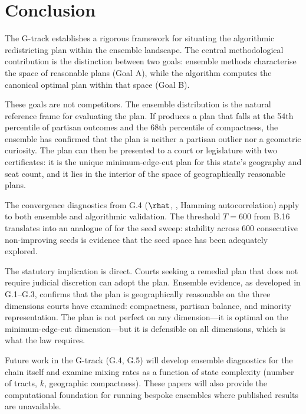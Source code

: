 \section{Conclusion}
\label{sec:conclusion}

The G-track establishes a rigorous framework for situating the \ar{}
algorithmic redistricting plan within the ensemble landscape.  The central
methodological contribution is the distinction between two goals: ensemble
methods characterise the space of reasonable plans (Goal A), while the
\ar{} algorithm computes the canonical optimal plan within that space (Goal B).

These goals are not competitors.  The ensemble distribution is the natural
reference frame for evaluating the \ar{} plan.  If \ar{} produces a plan that
falls at the 54th percentile of partisan outcomes and the 68th percentile of
compactness, the ensemble has confirmed that the plan is neither a partisan
outlier nor a geometric curiosity.  The plan can then be presented to a court
or legislature with two certificates: it is the unique minimum-edge-cut plan
for this state's geography and seat count, and it lies in the interior of the
space of geographically reasonable plans.

The convergence diagnostics from G.4 ($\rhat$, \ess{}, Hamming autocorrelation)
apply to both ensemble and algorithmic validation.  The \cs{} threshold
$T = 600$ from B.16 translates into an analogue of \ess{} for the seed
sweep: stability across 600 consecutive non-improving seeds is evidence that
the seed space has been adequately explored.

The statutory implication is direct.  Courts seeking a remedial plan that
does not require judicial discretion can adopt the \ar{} plan.  Ensemble
evidence, as developed in G.1--G.3, confirms that the plan is geographically
reasonable on the three dimensions courts have examined: compactness, partisan
balance, and minority representation.  The plan is not perfect on any
dimension---it is optimal on the minimum-edge-cut dimension---but it is
defensible on all dimensions, which is what the law requires.

Future work in the G-track (G.4, G.5) will develop ensemble diagnostics for
the \recom{} chain itself and examine mixing rates as a function of state
complexity (number of tracts, $k$, geographic compactness).  These papers
will also provide the computational foundation for running bespoke ensembles
where published results are unavailable.
